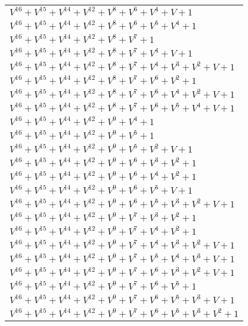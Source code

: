 \documentclass[12pt]{article}
\begin{document}
\begin{adjustwidth}{-4cm}{}
\begin{center}
\begin{longtable}{|l|}
$V^{16}  +V^{15}  +V^{14}  +V^{12}  +V^{8}  +V^{6}  +V^{4}  + V + 1$ \\
$V^{16}  +V^{15}  +V^{14}  +V^{12}  +V^{8}  +V^{6}  +V^{5}  +V^{4}  + 1$ \\
$V^{16}  +V^{15}  +V^{14}  +V^{12}  +V^{8}  +V^{7}  + 1$ \\
$V^{16}  +V^{15}  +V^{14}  +V^{12}  +V^{8}  +V^{7}  +V^{4}  + V + 1$ \\
$V^{16}  +V^{15}  +V^{14}  +V^{12}  +V^{8}  +V^{7}  +V^{4}  +V^{3}  +V^{2}  + V + 1$ \\
$V^{16}  +V^{15}  +V^{14}  +V^{12}  +V^{8}  +V^{7}  +V^{6}  +V^{2}  + 1$ \\
$V^{16}  +V^{15}  +V^{14}  +V^{12}  +V^{8}  +V^{7}  +V^{6}  +V^{4}  +V^{2}  + V + 1$ \\
$V^{16}  +V^{15}  +V^{14}  +V^{12}  +V^{8}  +V^{7}  +V^{6}  +V^{5}  +V^{4}  + V + 1$ \\
$V^{16}  +V^{15}  +V^{14}  +V^{12}  +V^{9}  +V^{4}  + 1$ \\
$V^{16}  +V^{15}  +V^{14}  +V^{12}  +V^{9}  +V^{5}  + 1$ \\
$V^{16}  +V^{15}  +V^{14}  +V^{12}  +V^{9}  +V^{5}  +V^{2}  + V + 1$ \\
$V^{16}  +V^{15}  +V^{14}  +V^{12}  +V^{9}  +V^{6}  +V^{3}  +V^{2}  + 1$ \\
$V^{16}  +V^{15}  +V^{14}  +V^{12}  +V^{9}  +V^{6}  +V^{4}  +V^{2}  + 1$ \\
$V^{16}  +V^{15}  +V^{14}  +V^{12}  +V^{9}  +V^{6}  +V^{5}  + V + 1$ \\
$V^{16}  +V^{15}  +V^{14}  +V^{12}  +V^{9}  +V^{6}  +V^{5}  +V^{3}  +V^{2}  + V + 1$ \\
$V^{16}  +V^{15}  +V^{14}  +V^{12}  +V^{9}  +V^{7}  +V^{3}  +V^{2}  + 1$ \\
$V^{16}  +V^{15}  +V^{14}  +V^{12}  +V^{9}  +V^{7}  +V^{4}  +V^{2}  + 1$ \\
$V^{16}  +V^{15}  +V^{14}  +V^{12}  +V^{9}  +V^{7}  +V^{4}  +V^{3}  +V^{2}  + V + 1$ \\
$V^{16}  +V^{15}  +V^{14}  +V^{12}  +V^{9}  +V^{7}  +V^{5}  +V^{4}  +V^{3}  + V + 1$ \\
$V^{16}  +V^{15}  +V^{14}  +V^{12}  +V^{9}  +V^{7}  +V^{6}  +V^{3}  +V^{2}  + V + 1$ \\
$V^{16}  +V^{15}  +V^{14}  +V^{12}  +V^{9}  +V^{7}  +V^{6}  +V^{5}  + 1$ \\
$V^{16}  +V^{15}  +V^{14}  +V^{12}  +V^{9}  +V^{7}  +V^{6}  +V^{5}  +V^{3}  + V + 1$ \\
$V^{16}  +V^{15}  +V^{14}  +V^{12}  +V^{9}  +V^{7}  +V^{6}  +V^{5}  +V^{3}  +V^{2}  + 1$ \\

\end{longtable}
\end{center}
\end{adjustwidth}
\end{document}

